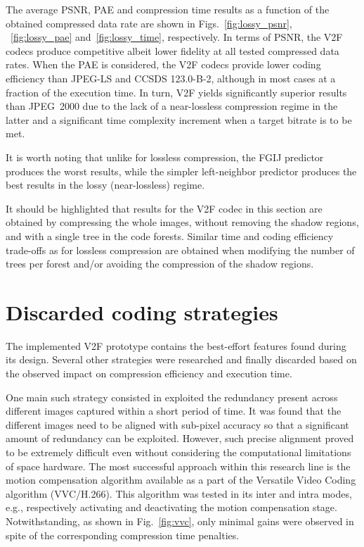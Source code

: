 \documentclass{class/technicalReportUAB}
\begin{document}
The average PSNR, PAE and compression time results as a function of the obtained compressed data rate are shown in Figs.~\ref{fig:lossy_psnr}, ~\ref{fig:lossy_pae} and~\ref{fig:lossy_time},
respectively. In terms of PSNR, the V2F codecs produce competitive albeit lower fidelity at all tested compressed data rates. 
When the PAE is considered, the V2F codecs provide lower coding efficiency than JPEG-LS and CCSDS 123.0-B-2, although in most cases at a fraction of the execution time.
In turn, V2F yields significantly superior results than JPEG~2000 due to the lack of a near-lossless compression regime in the latter
and a significant time complexity increment when a target bitrate is to be met.

It is worth noting that unlike for lossless compression, the FGIJ predictor produces the worst results, while the simpler left-neighbor predictor
produces the best results in the lossy (near-lossless) regime. 


It should be highlighted that results for the V2F codec in this section are obtained by compressing the whole images, without removing
the shadow regions, and with a single tree in the code forests. 
Similar time and coding efficiency trade-offs as for lossless compression are obtained when modifying the number of trees per forest
and/or avoiding the compression of the shadow regions.

\section{Discarded coding strategies}\label{sec:discarded}

The implemented V2F prototype contains the best-effort features found during its design. Several other strategies were researched
and finally discarded based on the observed impact on compression efficiency and execution time.

One main such strategy consisted in exploited the redundancy present across different images captured within a short period of time.
It was found that the different images need to be aligned with sub-pixel accuracy so that a significant amount of redundancy can be exploited.
However, such precise alignment proved to be extremely difficult even without considering the computational limitations of space hardware.
The most successful approach within this research line is the motion compensation algorithm available as a part of the Versatile Video Coding algorithm (VVC/H.266).
This algorithm was tested in its inter and intra modes, e.g., respectively activating and deactivating the motion compensation stage.
Notwithstanding, as shown in Fig.~\ref{fig:vvc}, only minimal gains were observed in spite of the corresponding compression time penalties.
\end{document}
